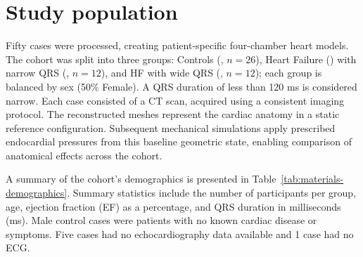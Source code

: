 \section{Study population}
Fifty cases were processed, creating patient-specific four-chamber heart models. 
The cohort was split into three groups: Controls (\Ctl, $n=26$), Heart Failure (\HF) with narrow QRS (\HFN, $n=12$), 
and HF with wide QRS (\HFW, $n=12$); each group is balanced by sex (50\% Female).
A QRS duration of less than 120 ms is considered narrow. 
Each case consisted of a CT scan, acquired using a consistent imaging 
protocol. The reconstructed meshes represent the cardiac anatomy in a 
static reference configuration. Subsequent mechanical simulations apply 
prescribed endocardial pressures from this baseline geometric state, 
enabling comparison of anatomical effects across the cohort.

A summary of the cohort's demographics is presented in Table~\ref{tab:materials-demographics}. 
Summary statistics include the number of participants per group, age, 
ejection fraction (EF) as a percentage, and QRS duration in milliseconds (ms). 
Male control cases were patients with no known cardiac disease or symptoms. 
Five cases had no echocardiography data available and 1 case had no ECG.

